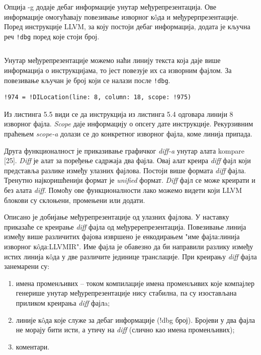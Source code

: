 \documentclass[12pt,oneside]{memoir}
\begin{document}
Опција -g додаје дебаг информације унутар међурепрезентација.
Ове информације омогућавају повезивање изворног к\^{o}да и међурерпрезентације.
Поред инструкције LLVM, за коју постоји дебаг информација, додата је кључна реч
\texttt{!dbg} поред које стоји број.
\begin{lstlisting}[frame=single, caption=Primer debug ključne reči, captionpos=b]
  %4 = mul nsw i32 %0, %0, !dbg !974
\end{lstlisting}
Унутар међурепрезентације можемо наћи линију текста која даје више информација о
инструкцијама, то јест повезује их са изворним фајлом.
За повезивање кључан је број који се налази после \texttt{!dbg}.
\begin{lstlisting}[frame=single, caption=Primer debug linije koja povezuje izvorni kod sa međureprezentacijom, captionpos=b]
!974 = !DILocation(line: 8, column: 18, scope: !975)
\end{lstlisting}

Из листинга 5.5 види се да инструкција из листинга 5.4 одговара линији 8 изворног фајла.
\textit{Scope} даје информацију о опсегу дате инструкције.
Рекурзивним праћењем \textit{scope-a} долази се до конкретног изворног фајла, коме линија припада.

Друга функционалност је приказивање графичког \textit{diff-a} унутар алата kompare [25].
\textit{Diff} је алат за поређење садржаја два фајла.
Овај алат креира \textit{diff} фајл који представља разлике између улазних фајлова.
Постоји више формата \textit{diff} фајла. 
Тренутно најкоришћенији формат је \textit{unified} формат.
\textit{Diff} фајл се може креирати и без алата \textit{diff}.
Помоћу ове функционалности лако можемо видети који LLVM блокови су склоњени, 
промењени или додати.

Описано је добијање међурепрезентације од улазних фајлова.
У наставку приказаће се креирање \textit{diff} фајла од међуререпрезентација.
Повезивање линија између више различитих фајова извршено је енкодирањем "име фајла:линија изворног  к\^{o}да:LLVMIR".
Име фајла је обавезно да би направили разлику између истих линија  к\^{o}да у две различите јединице транслације.
При креирању \textit{diff} фајла занемарени су:
\begin{enumerate}
\item имена променљивих -- током компилације имена променљивих које компајлер генерише унутар међурепрезентације нису стабилна, па су изостављана приликом
креирања \textit{diff} фајлa; 
\item линије к\^{o}да које служе за дебаг информације (!dbg број). Бројеви у два
	фајла не морају бити исти, а утичу на \textit{diff} (слично као имена променљивих);
\item коментари.
\end{enumerate}
\end{document}
